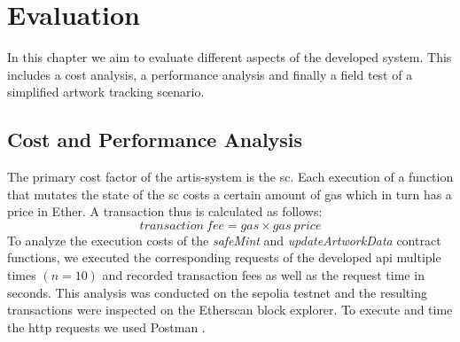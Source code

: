 \chapter{Evaluation}
\label{chap:evaluation}
In this chapter we aim to evaluate different aspects of the developed system. This includes a cost analysis, a performance analysis and finally a field test of a simplified artwork tracking scenario.

\section{Cost and Performance Analysis}
The primary cost factor of the artis-system is the \gls{sc}. Each execution of a function that mutates the state of the \gls{sc} costs a certain amount of gas which in turn has a price in Ether. A transaction thus is calculated as follows:
$$
transaction\ fee = gas \times gas\ price
$$
To analyze the execution costs of the \textit{safeMint} and \textit{updateArtworkData} contract functions, we executed the corresponding requests of the developed \gls{api} multiple times $(n = 10)$ and recorded transaction fees as well as the request time in seconds. This analysis was conducted on the sepolia testnet and the resulting transactions were inspected on the Etherscan block explorer. To execute and time the \gls{http} requests we used Postman \cite{postman}.

